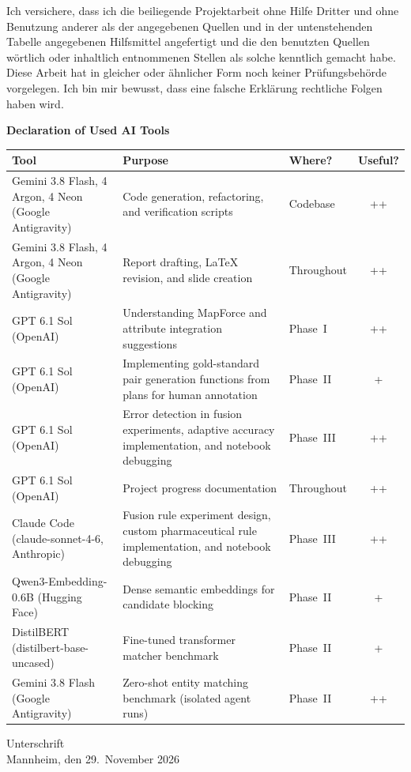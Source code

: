 \documentclass{llncs}
\begin{document}
Ich versichere, dass ich die beiliegende Projektarbeit ohne Hilfe Dritter und ohne Benutzung anderer als der angegebenen Quellen und in der untenstehenden Tabelle angegebenen Hilfsmittel angefertigt und die den benutzten Quellen w\"ortlich oder inhaltlich entnommenen Stellen als solche kenntlich gemacht habe. Diese Arbeit hat in gleicher oder \"ahnlicher Form noch keiner Pr\"ufungsbeh\"orde vorgelegen. Ich bin mir bewusst, dass eine falsche Erkl\"arung rechtliche Folgen haben wird.

\begin{center}
  \textbf{Declaration of Used AI Tools} \\[.3em]
  {\footnotesize\setlength{\tabcolsep}{7pt}%
  \begin{tabularx}{\textwidth}{@{}L{3.5cm}>{\raggedright\arraybackslash}X L{1.85cm}c@{}}
    \toprule
    Tool & Purpose & Where? & Useful? \\
    \midrule
    Gemini 3.8 Flash, 4 Argon, 4 Neon (Google Antigravity) & Code generation, refactoring, and verification scripts & Codebase & ++ \\
    \addlinespace[1pt]
    Gemini 3.8 Flash, 4 Argon, 4 Neon (Google Antigravity) & Report drafting, LaTeX revision, and slide creation & Throughout & ++ \\
    \addlinespace[3pt]
    GPT 6.1 Sol (OpenAI) & Understanding MapForce and attribute integration suggestions & Phase~I & ++ \\
    \addlinespace[1pt]
    GPT 6.1 Sol (OpenAI) & Implementing gold-standard pair generation functions from plans for human annotation & Phase~II & + \\
    \addlinespace[1pt]
    GPT 6.1 Sol (OpenAI) & Error detection in fusion experiments, adaptive accuracy implementation, and notebook debugging & Phase~III & ++ \\
    \addlinespace[1pt]
    GPT 6.1 Sol (OpenAI) & Project progress documentation & Throughout & ++ \\
    \addlinespace[3pt]
    Claude Code (claude-sonnet-4-6, Anthropic) & Fusion rule experiment design, custom pharmaceutical rule implementation, and notebook debugging & Phase~III & ++ \\
    \midrule
    Qwen3-Embedding-0.6B (Hugging Face) & Dense semantic embeddings for candidate blocking & Phase~II & + \\
    \addlinespace[1pt]
    DistilBERT (distilbert-base-uncased) & Fine-tuned transformer matcher benchmark & Phase~II & + \\
    \addlinespace[1pt]
    Gemini 3.8 Flash (Google Antigravity) & Zero-shot entity matching benchmark (isolated agent runs) & Phase~II & ++ \\
    \bottomrule
  \end{tabularx}}
\end{center}

\vspace{0.8cm}
\noindent Unterschrift\\
\noindent Mannheim, den 29.~November 2026 \hfill
\end{document}
